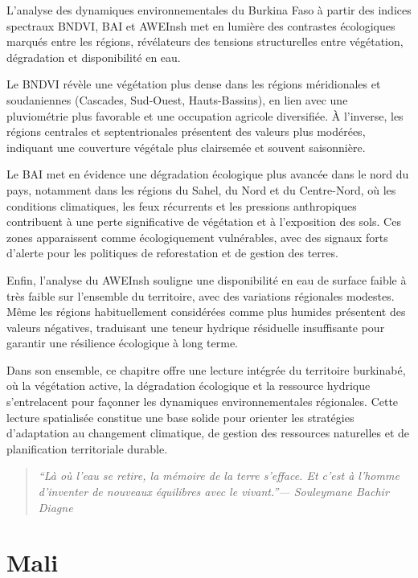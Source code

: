 \documentclass[
]{book}
\begin{document}
L'analyse des dynamiques environnementales du Burkina Faso à partir des indices spectraux BNDVI, BAI et AWEInsh met en lumière des contrastes écologiques marqués entre les régions, révélateurs des tensions structurelles entre végétation, dégradation et disponibilité en eau.

Le BNDVI révèle une végétation plus dense dans les régions méridionales et soudaniennes (Cascades, Sud-Ouest, Hauts-Bassins), en lien avec une pluviométrie plus favorable et une occupation agricole diversifiée. À l'inverse, les régions centrales et septentrionales présentent des valeurs plus modérées, indiquant une couverture végétale plus clairsemée et souvent saisonnière.

Le BAI met en évidence une dégradation écologique plus avancée dans le nord du pays, notamment dans les régions du Sahel, du Nord et du Centre-Nord, où les conditions climatiques, les feux récurrents et les pressions anthropiques contribuent à une perte significative de végétation et à l'exposition des sols. Ces zones apparaissent comme écologiquement vulnérables, avec des signaux forts d'alerte pour les politiques de reforestation et de gestion des terres.

Enfin, l'analyse du AWEInsh souligne une disponibilité en eau de surface faible à très faible sur l'ensemble du territoire, avec des variations régionales modestes. Même les régions habituellement considérées comme plus humides présentent des valeurs négatives, traduisant une teneur hydrique résiduelle insuffisante pour garantir une résilience écologique à long terme.

Dans son ensemble, ce chapitre offre une lecture intégrée du territoire burkinabé, où la végétation active, la dégradation écologique et la ressource hydrique s'entrelacent pour façonner les dynamiques environnementales régionales. Cette lecture spatialisée constitue une base solide pour orienter les stratégies d'adaptation au changement climatique, de gestion des ressources naturelles et de planification territoriale durable.

\begin{quote}
\emph{``Là où l'eau se retire, la mémoire de la terre s'efface. Et c'est à l'homme d'inventer de nouveaux équilibres avec le vivant.''--- Souleymane Bachir Diagne}
\end{quote}

\chapter{Mali}\label{mali}
\end{document}
